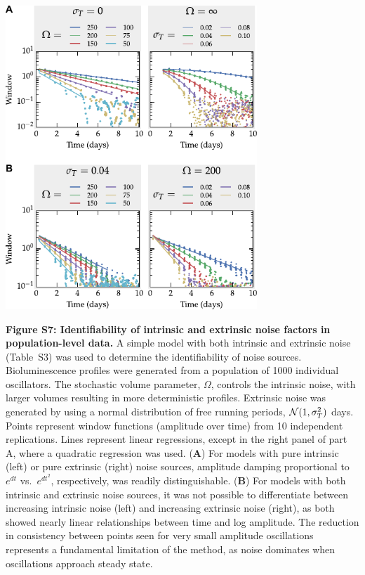 \documentclass[11pt, letterpaper]{article}
\newenvironment{manuscript}[1]{\begin{center}\begin{tcolorbox}[colback=green!5!white,colframe=green!75!black,width=\textwidth,title={#1},breakable,fonttitle=\bfseries]}{\end{tcolorbox}\end{center}}
\begin{document}
\begin{manuscript}{Page 16}
  \begin{center}
  \includegraphics[width=0.71\textwidth]{figures/pdfs/FigS7.pdf}
  \end{center}
  {\bfseries Figure S7: Identifiability of intrinsic and extrinsic noise factors in population-level data.} A simple model with both intrinsic and extrinsic noise (Table~S3) was used to determine the identifiability of noise sources. Bioluminescence profiles were generated from a population of 1000 individual oscillators. The stochastic volume parameter, $\Omega$, controls the intrinsic noise, with larger volumes resulting in more deterministic profiles. Extrinsic noise was generated by using a normal distribution of free running periods, ${\cal N}(1, \sigma^2_T)$ days. Points represent window functions (amplitude over time) from 10 independent replications. Lines represent linear regressions, except in the right panel of part A, where a quadratic regression was used.
  ({\bfseries A}) For models with pure intrinsic (left) or pure extrinsic (right) noise sources, amplitude damping proportional to $e^{dt}$ vs.\ $e^{dt^2}$, respectively, was readily distinguishable. 
  ({\bfseries B}) For models with both intrinsic and extrinsic noise sources, it was not possible to differentiate between increasing intrinsic noise (left) and increasing extrinsic noise (right), as both showed nearly linear relationships between time and log amplitude.
  The reduction in consistency between points seen for very small amplitude oscillations represents a fundamental limitation of the method, as noise dominates when oscillations approach steady state.
  
\end{manuscript}
\end{document}
